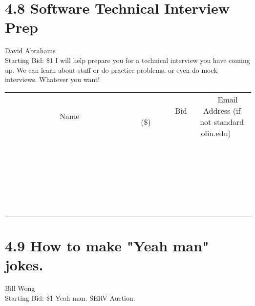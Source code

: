 \documentclass[11pt]{article}
\begin{document}
\section*{4.8 Software Technical Interview Prep}
David Abrahams
\\
Starting Bid: \$1
\newline
I will help prepare you for a technical interview you have coming up. We can learn about stuff or do practice problems, or even do mock interviews. Whatever you want!
\\[6ex]
\begin{tabular}{c c c}
~~~~~~~~~~~~~Name~~~~~~~~~~~~~ & ~~~~~~~~~Bid (\$)~~~~~~~~~  & ~~~Email Address (if not standard olin.edu)~~~\\
 & & \\
\hline
 & & \\
\hline
 & & \\
\hline
 & & \\
\hline
 & & \\
\hline
 & & \\
\hline
 & & \\
\hline
 & & \\
\hline
 & & \\
\hline
 & & \\
\hline
 & & \\
\hline
 & & \\
\hline
 & & \\
\hline
 & & \\
\hline
 & & \\
\hline
 & & \\
\hline
 & & \\
\hline
 & & \\
\hline
 & & \\
\hline
 & & \\
\hline
 & & \\
\hline
 & & \\
\hline
 & & \\
\hline
 & & \\
\hline
 & & \\
\hline
 & & \\
\hline
\end{tabular}
\newpage
\section*{4.9 How to make "Yeah man" jokes.}
Bill Wong
\\
Starting Bid: \$1
\newline
Yeah man. SERV Auction.
\end{document}
